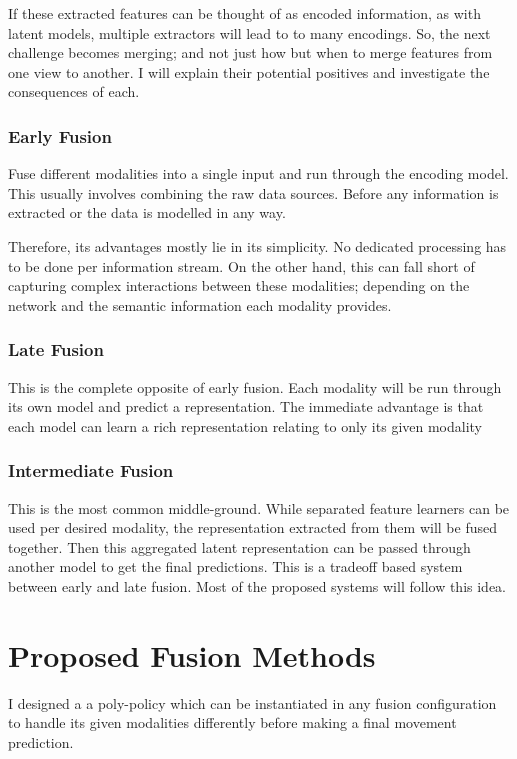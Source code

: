 If these extracted features can be thought of as encoded information, as with latent models, multiple extractors will lead to to many encodings. So, the next challenge becomes merging; and not just how but when to merge features from one view to another. I will explain their potential positives and investigate the consequences of each.

\subsubsection{Early Fusion}
Fuse different modalities into a single input and run through the encoding model. This usually involves combining the raw data sources. Before any information is extracted or the data is modelled in any way.

Therefore, its advantages mostly lie in its simplicity. No dedicated processing has to be done per information stream. On the other hand, this can fall short of capturing complex interactions between these modalities; depending on the network and the semantic information each modality provides.

\subsubsection{Late Fusion}
This is the complete opposite of early fusion. Each modality will be run through its own model and predict a representation. The immediate advantage is that each model can learn a rich representation relating to only its given modality


\subsubsection{Intermediate Fusion}
This is the most common middle-ground. While separated feature learners can be used per desired modality, the representation extracted from them will be fused together. Then this aggregated latent representation can be passed through another model to get the final predictions. This is a tradeoff based system between early and late fusion. Most of the proposed systems will follow this idea.


\section{Proposed Fusion Methods}
I designed a a poly-policy which can be instantiated in any fusion configuration to handle its given modalities differently before making a final movement prediction. 

